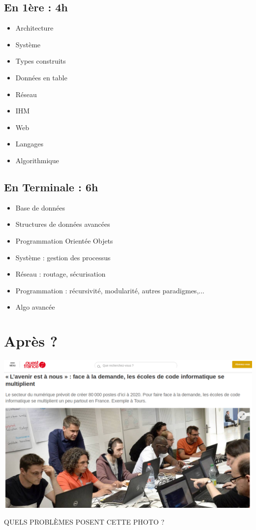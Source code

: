\documentclass[french,handout]{beamer}
\begin{document}
\subsection{En 1ère : 4h}

\begin{frame}
  \begin{itemize}
  \item Architecture
  \item Système
  \item Types construits
  \item Données en table
  \item Réseau
  \item IHM
  \item Web
  \item Langages
  \item Algorithmique
  \end{itemize}
\end{frame}

\subsection{En Terminale : 6h}


\begin{frame}
  \begin{itemize}
  \item Base de données
  \item Structures de données avancées
  \item Programmation Orientée Objets
  \item Système : gestion des processus
  \item Réseau : routage, sécurisation
  \item Programmation : récursivité, modularité, autres paradigmes,...
    \item Algo avancée
  \end{itemize}
\end{frame}



\section{Après ?}

\begin{frame}
  
\begin{center}
  \includegraphics[width=\linewidth]{ouest}
\end{center}

QUELS PROBLÈMES POSENT CETTE PHOTO ?

\end{frame}
\end{document}
